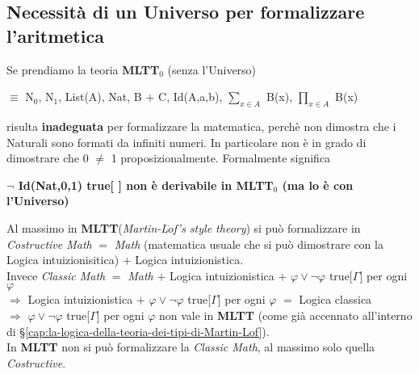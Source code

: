 \subsection{Necessit\`a di un Universo per formalizzare l'aritmetica}
\label{subsec:Necessit\`a-di-un-Universo-per-formalizzare-l'aritmetica}
Se prendiamo la teoria \textbf{MLTT$_0$} (senza l'Universo) \begin{center}$\equiv$ N$_0$, N$_1$, List(A), Nat, B $+$ C, Id(A,a,b), $\sum\limits_{x \in A}$ B(x), $\prod\limits_{x \in A}$ B(x)\end{center}
\noindent
risulta \textbf{inadeguata} per formalizzare la matematica, perch\`e non dimostra che i Naturali sono formati da infiniti numeri. In particolare non \`e in grado di dimostrare che 0 $\neq$ 1 proposizionalmente. Formalmente significa
\begin{center}\textbf{$\neg$ Id(Nat,0,1) true[ ] non \`e derivabile in MLTT$_0$ (ma lo \`e con l'Universo)}\end{center}
\noindent
Al massimo in \textbf{MLTT}(\textit{Martin-L$\ddot{o}$f's style theory}) si pu\`o formalizzare in \textit{Costructive Math} $=$ \textit{Math}  (matematica usuale che si pu\`o dimostrare con la Logica intuizionisitica) $+$ Logica intuizionistica.\\
Invece \textit{Classic Math} $=$ \textit{Math} $+$ Logica intuizionistica $+$ $\varphi \vee \neg\varphi$ true[$\Gamma$] per ogni $\varphi$\\
$\Rightarrow$ Logica intuizionistica $+$ $\varphi \vee \neg\varphi$ true[$\Gamma$] per ogni $\varphi$ $=$ Logica classica\\
$\Rightarrow$ $\varphi \vee \neg\varphi$ true[$\Gamma$] per ogni $\varphi$ non vale in \textbf{MLTT} (come gi\`a accennato all'interno di \S\ref{cap:la-logica-della-teoria-dei-tipi-di-Martin-Lof}).\\
In \textbf{MLTT} non si pu\`o formalizzare la \textit{Classic Math}, al massimo solo quella \textit{Costructive}.
